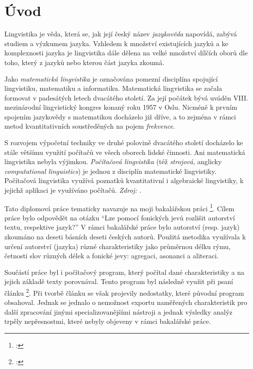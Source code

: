 \documentclass[dp.tex]{subfiles}
\begin{document}
\chapter*{Úvod}
\label{chap:uvod} 

Lingvistika je věda, která se, jak její český název \textit{jazykověda} napovídá, zabývá studiem a výzkumem jazyka. Vzhledem k množství existujících jazyků a ke komplexnosti jazyka je lingvistika dále dělena na velké množství dílčích oborů dle toho, který z jazyků nebo kterou část jazyka zkoumá.

Jako \textit{matematická lingvistika} je označována pomezní disciplína spojující lingvistiku, matematiku a informatiku. Matematická lingvistika se začala formovat v padesátých letech dvacátého století. Za její počátek bývá uváděn VIII. mezinárodní lingvistický kongres konaný roku 1957 v Oslu. Nicméně k prvním spojením jazykovědy s matematikou docházelo již dříve, a to zejména v rámci metod kvantitativních soustředěných na pojem \textit{frekvence}. 

S rozvojem výpočetní techniky ve druhé polovině dvacátého století docházelo ke stále většímu využití počítačů ve všech oborech lidské činnosti. Ani matematická lingvistika nebyla výjimkou. \textit{Počítačová lingvistika} (též \textit{strojová}, anglicky \textit{computational linguistics}) je jednou z disciplín matematické lingvistiky. Počítačová lingvistika využívá poznatků kvantitativní i algebraické lingvistiky, k jejichž aplikaci je využíváno počítačů. \textit{Zdroj: \cite{Cerny1996}}.

Tato diplomová práce tematicky navazuje na moji bakalářskou práci \footnote{\cite{Slahora2012}: }. Cílem práce bylo odpovědět na otázku \enquote{Lze pomocí fonických jevů rozlišit autorství textu, respektive jazyk?} V rámci bakalářské práce bylo autorství (resp. jazyk) zkoumáno na deseti básních deseti českých autorů. Použitá metodika využívala k určení autorství (jazyka) různé charakteristiky jako průměrnou délku rýmu, četnosti slov různých délek a fonické jevy: agregaci, asonanci a aliteraci.

Součástí práce byl i počítačový program, který počítal dané charakteristiky a na jejich základě texty porovnával. Tento program byl následně využit při psaní článku \footnote{\cite{Marek2013}: }. Při tvorbě článku se však projevily nedostatky, které původní program obsahoval. Jednak se jednalo o nemožnost exportu naměřených charakteristik pro další zpracování jinými specializovanějšími nástroji a jednak výsledky analýz trpěly nepřesnostmi, které nebyly objeveny v rámci bakalářské práce.
\end{document}
